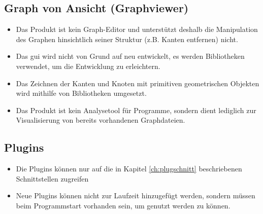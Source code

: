 \subsection{Graph von Ansicht (Graphviewer)}
  \begin{itemize}
    \item Das Produkt ist kein Graph-Editor und unterstützt deshalb die Manipulation des Graphen hinsichtlich seiner Struktur (z.B. Kanten entfernen) nicht.
    \item Das \gls{gui} wird nicht von Grund auf neu entwickelt, es werden Bibliotheken verwendet, um die Entwicklung zu erleichtern.
    \item Das Zeichnen der Kanten und Knoten mit primitiven geometrischen Objekten wird mithilfe von Bibliotheken umgesetzt. %
    \item Das Produkt ist kein Analysetool für Programme, sondern dient lediglich zur Visualisierung von bereits vorhandenen Graphdateien.
  \end{itemize}
\subsection{Plugins}
  \begin{itemize}
    \item Die Plugins können nur auf die in Kapitel \ref{ch:plugschnitt} beschriebenen Schnittstellen zugreifen
    \item Neue Plugins können nicht zur Laufzeit hinzugefügt werden, sondern müssen beim Programmstart vorhanden sein, um genutzt werden zu können.
  \end{itemize}
